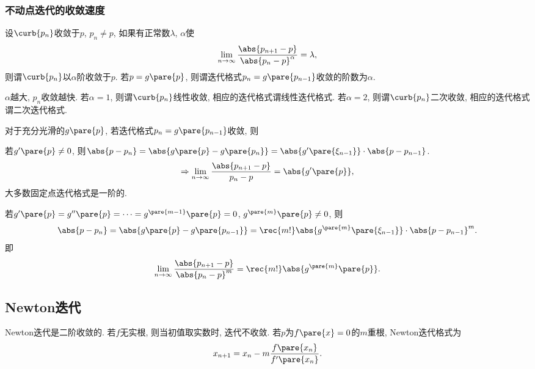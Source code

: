 \documentclass[hidelinks]{ctexart}
\begin{document}

\subsubsection{不动点迭代的收敛速度} %
\label{ssub:不动点迭代的收敛速度}

\begin{definition}
    设$\curb{p_n}$收敛于$p$, $p_n \neq p$, 如果有正常数$\lambda$, $\alpha$使
    \[ \lim_{n\rightarrow \infty} \frac{\abs{p_{n+1} - p}}{\abs{p_n - p}^\alpha} = \lambda, \]
    则谓$\curb{p_n}$以$\alpha$阶收敛于$p$. 若$p = g\pare{p}$, 则谓迭代格式$p_n = g\pare{p_{n-1}}$收敛的阶数为$\alpha$.
\end{definition}
$\alpha$越大, $p_n$收敛越快. 若$\alpha = 1$, 则谓$\curb{p_n}$线性收敛, 相应的迭代格式谓线性迭代格式. 若$\alpha = 2$, 则谓$\curb{p_n}$二次收敛, 相应的迭代格式谓二次迭代格式.
\par
对于充分光滑的$g\pare{p}$, 若迭代格式$p_n = g\pare{p_{n-1}}$收敛, 则
\begin{cenum}
    \item 若$g'\pare{p} \neq 0$, 则$\abs{p-p_n} = \abs{g\pare{p} - g\pare{p_n }} = \abs{g'\pare{\xi_{n-1}}}\cdot \abs{p-p_{n-1}}$.
    \[ \Rightarrow \lim_{n\rightarrow \infty} \frac{\abs{p_{n+1} - p}}{p_n - p} = \abs{g'\pare{p}}, \]
    大多数固定点迭代格式是一阶的.
    \item 若$g'\pare{p} = g''\pare{p} = \cdots = g^{\pare{m-1}}\pare{p} = 0$, $g^{\pare{m}}\pare{p} \neq 0$, 则
    \[ \abs{p-p_n} = \abs{g\pare{p} - g\pare{p_{n-1}}} = \rec{m!}\abs{g^{\pare{m}}\pare{\xi_{n-1}}}\cdot \abs{p-p_{n-1}}^m. \]
    即
    \[ \lim_{n\rightarrow \infty} \frac{\abs{p_{n+1} - p}}{\abs{p_n - p}^m} = \rec{m!}\abs{g^{\pare{m}}\pare{p}}. \]
\end{cenum}



\subsection{Newton迭代} %
\label{sub:newton迭代}

\newpoint{}Newton迭代是二阶收敛的.
\newpoint{}若$f$无实根, 则当初值取实数时, 迭代不收敛.
\newpoint{}若$p$为$f\pare{x} = 0$的$m$重根, Newton迭代格式为
\[ x_{n+1} = x_n - m \frac{f\pare{x_n}}{f'\pare{x_n}}. \]

\end{document}
